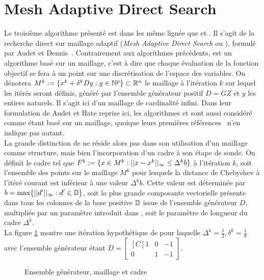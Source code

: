 \section{Mesh Adaptive Direct Search}\label{sec:mad}
Le troisième algorithme présenté est dans les même lignée que \CS et \GPS. Il s'agit de la recherche direct sur maillage adaptif (\emph{Mesh Adaptive Direct Search} ou \MADS), formulé par Audet et Dennis~\cite{AuDe2006}. Contrairement aux algorithmes précédents, \MADS est un algorithme basé sur un maillage, c'est à dire que chaque évaluation de la fonction objectif se fera à un point sur une discrétisation de l'espace des variables. On dénotera $M^k:=\{x^k + \delta^kDy : y \in \mathbb{N}^p\} \subset \mathbb{R}^n$ le maillage à l'itération $k$ sur lequel les itérés seront définis, généré par l'ensemble générateur positif $D = GZ$ et $y$ les entiers naturels. Il s'agit ici d'un maillage de cardinalité infini. Dans leur formulation de Audet et Hate reprise ici, les algorithmes \CS et \GPS sont aussi considéré comme étant basé sur un maillage, quoique leurs premières références~\cite{HoJe61a,Torc97a} n'en indique pas autant.\\
La grande distinction de \MADS ne réside alors pas dans son utilisation d'un maillage comme structure, mais bien l'incorporation d'un cadre à son étape de sonde. On définit le cadre tel que $F^k:=\{x\in M^k : ||x-x^k||_{\infty} \leq \Delta^k b \}$ à l'itération $k$, soit l'ensemble des points sur le maillage $M^k$ pour lesquels la distance de Chebyshev à l'itéré courant est inférieur à une valeur $\Delta ^k b$. Cette valeur est déterminée par $b = \max\{||d'||_{\infty}:d' \in \mathbb{D}\}$, soit la plus grande composante vectorielle présente dans tous les colonnes de la base positive $\mathbb{D}$ issue de l'ensemble générateur $D$, multipliée par un paramètre introduit dans \MADS, soit le paramètre de longueur du cadre $\Delta^k$.\\
La figure \ref{fig:MADS} montre une itération hypothétique de \MADS pour laquelle $\Delta^k = \frac{1}{2}, \delta^k = \frac{1}{8}$ avec l'ensemble générateur étant
$D = \begin{bmatrix*}[C]
1 & 0 &-1\\
0 & 1 & -1
\end{bmatrix*}$. \\
\begin{figure}[H] %
	\begin{center}
	\end{center}
	\caption{Ensemble générateur, maillage et cadre}
	\label{fig:MADS}
\end{figure}
